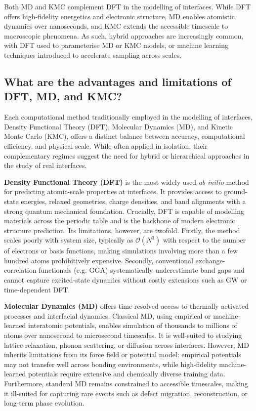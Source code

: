 Both MD and KMC complement DFT in the modelling of interfaces. While DFT offers high-fidelity energetics and electronic structure, MD enables atomistic dynamics over nanoseconds, and KMC extends the accessible timescale to macroscopic phenomena. As such, hybrid approaches are increasingly common, with DFT used to parameterise MD or KMC models, or machine learning techniques introduced to accelerate sampling across scales. 
 
\subsection{What are the advantages and limitations of DFT, MD, and KMC?} 
 
Each computational method traditionally employed in the modelling of interfaces, Density Functional Theory (DFT), Molecular Dynamics (MD), and Kinetic Monte Carlo (KMC), offers a distinct balance between accuracy, computational efficiency, and physical scale. While often applied in isolation, their complementary regimes suggest the need for hybrid or hierarchical approaches in the study of real interfaces. 
 
\textbf{Density Functional Theory (DFT)} is the most widely used \textit{ab initio} method for predicting atomic-scale properties at interfaces. It provides access to ground-state energies, relaxed geometries, charge densities, and band alignments with a strong quantum mechanical foundation. Crucially, DFT is capable of modelling materials across the periodic table and is the backbone of modern electronic structure prediction. Its limitations, however, are twofold. Firstly, the method scales poorly with system size, typically as $\mathcal{O}(N^3)$ with respect to the number of electrons or basis functions, making simulations involving more than a few hundred atoms prohibitively expensive. Secondly, conventional exchange-correlation functionals (e.g. GGA) systematically underestimate band gaps and cannot capture excited-state dynamics without costly extensions such as GW or time-dependent DFT. 
 
\textbf{Molecular Dynamics (MD)} offers time-resolved access to thermally activated processes and interfacial dynamics. Classical MD, using empirical or machine-learned interatomic potentials, enables simulation of thousands to millions of atoms over nanosecond to microsecond timescales. It is well-suited to studying lattice relaxation, phonon scattering, or diffusion across interfaces. However, MD inherits limitations from its force field or potential model: empirical potentials may not transfer well across bonding environments, while high-fidelity machine-learned potentials require extensive and chemically diverse training data. Furthermore, standard MD remains constrained to accessible timescales, making it ill-suited for capturing rare events such as defect migration, reconstruction, or long-term phase evolution. 
 

